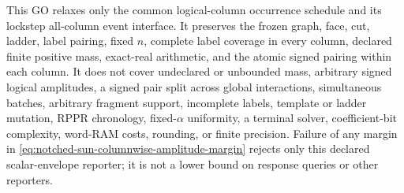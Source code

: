 \begin{theorem}
This GO relaxes only the common logical-column occurrence schedule and its
lockstep all-column event interface.  It preserves the frozen graph, face,
cut, ladder, label pairing, fixed $n$, complete label coverage in every
column, declared finite positive mass, exact-real arithmetic, and the atomic
signed pairing within each column.  It does not cover undeclared or unbounded
mass, arbitrary signed logical amplitudes, a signed pair split across global
interactions, simultaneous batches, arbitrary fragment support, incomplete
labels, template or ladder mutation, RPPR chronology, fixed-$\alpha$
uniformity, a terminal solver, coefficient-bit complexity, word-RAM costs,
rounding, or finite precision.  Failure of any margin in
\cref{eq:notched-sun-columnwise-amplitude-margin} rejects only this declared
scalar-envelope reporter; it is not a lower bound on response queries or
other reporters.
\end{theorem}

